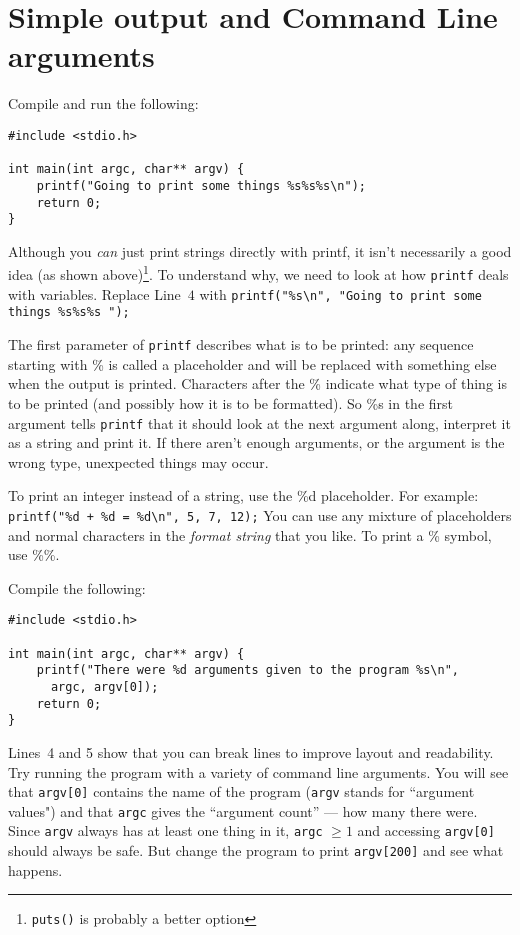 
\chapter{Simple output and Command Line arguments}


Compile and run the following:
\begin{lstlisting}
#include <stdio.h>

int main(int argc, char** argv) {
    printf("Going to print some things %s%s%s\n");
    return 0;
}
\end{lstlisting}

Although you \emph{can} just print strings directly with printf, it isn't necessarily a good idea (as shown above)\footnote{\texttt{puts()} is probably a better option}.
To understand why, we need to look at how \texttt{printf} deals with variables.
Replace Line~$4$ with \lstinline!printf("%s\n", "Going to print some things %s%s%s ");!

The first parameter of \texttt{printf} describes what is to be printed: any sequence starting with \% is called a placeholder and will be replaced with something else when the output is printed.
Characters after the \% indicate what type of thing is to be printed (and possibly how it is to be formatted).
So \%s in the first argument tells \texttt{printf} that it should look at the next argument along, interpret it as a string and print it.
If there aren't enough arguments, or the argument is the wrong type, unexpected things may occur.

To print an integer instead of a string, use the \%d placeholder.
For example: \lstinline!printf("%d + %d = %d\n", 5, 7, 12);!
You can use any mixture of placeholders and normal characters in the \emph{format string} that you like.
To print a \% symbol, use \%\%.


Compile the following:
\begin{lstlisting}
#include <stdio.h>

int main(int argc, char** argv) {
    printf("There were %d arguments given to the program %s\n",
      argc, argv[0]);
    return 0;
}
\end{lstlisting}
Lines~4 and 5 show that you can break lines to improve layout and readability.
Try running the program with a variety of command line arguments.
You will see that \texttt{argv[0]} contains the name of the program (\texttt{argv} stands for ``argument values") and that \texttt{argc} gives the ``argument count'' --- how many there were.
Since \texttt{argv} always has at least one thing in it, \texttt{argc} $\geq 1$ and accessing \texttt{argv[0]} should always be safe.
But change the program to print \texttt{argv[200]} and see what happens.


